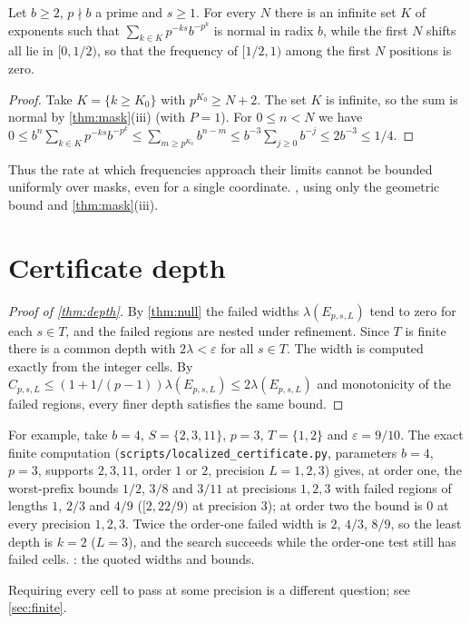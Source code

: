 \documentclass[11pt]{article}
\newcommand{\vol}{\lambda}
\begin{document}
\begin{proposition}\label{prop:uniform}
Let $b\ge2$, $p\nmid b$ a prime and $s\ge1$. For every $N$ there is an infinite set $K$ of exponents such that $\sum_{k\in K}p^{-ks}b^{-p^k}$ is normal in radix $b$, while the first $N$ shifts all lie in $[0,1/2)$, so that the frequency of $[1/2,1)$ among the first $N$ positions is zero.
\end{proposition}
\begin{proof}
Take $K=\{k\ge K_0\}$ with $p^{K_0}\ge N+2$. The set $K$ is infinite, so the sum is normal by \cref{thm:mask}(iii) (with $P=1$). For $0\le n<N$ we have $0\le b^n\sum_{k\in K}p^{-ks}b^{-p^k}\le\sum_{m\ge p^{K_0}}b^{n-m}\le b^{-3}\sum_{j\ge0}b^{-j}\le2b^{-3}\le1/4$.
\end{proof}
Thus the rate at which frequencies approach their limits cannot be bounded uniformly over masks, even for a single coordinate. , using only the geometric bound and \cref{thm:mask}(iii).

\section{Certificate depth}\label{sec:depthproof}
\begin{proof}[Proof of \cref{thm:depth}]
By \cref{thm:null} the failed widths $\vol(E_{p,s,L})$ tend to zero for each $s\in T$, and the failed regions are nested under refinement. Since $T$ is finite there is a common depth with $2\vol<\varepsilon$ for all $s\in T$. The width is computed exactly from the integer cells. By $C_{p,s,L}\le(1+1/(p-1))\vol(E_{p,s,L})\le2\vol(E_{p,s,L})$ and monotonicity of the failed regions, every finer depth satisfies the same bound.
\end{proof}
For example, take $b=4$, $S=\{2,3,11\}$, $p=3$, $T=\{1,2\}$ and $\varepsilon=9/10$. The exact finite computation (\texttt{scripts/localized\_certificate.py}, parameters $b=4$, $p=3$, supports $2,3,11$, order $1$ or $2$, precision $L=1,2,3$) gives, at order one, the worst-prefix bounds $1/2$, $3/8$ and $3/11$ at precisions $1,2,3$ with failed regions of lengths $1$, $2/3$ and $4/9$ ($[2,22/9)$ at precision $3$); at order two the bound is $0$ at every precision $1,2,3$. Twice the order-one failed width is $2$, $4/3$, $8/9$, so the least depth is $k=2$ ($L=3$), and the search succeeds while the order-one test still has failed cells. : the quoted widths and bounds.

Requiring every cell to pass at some precision is a different question; see \cref{sec:finite}.
\end{document}
